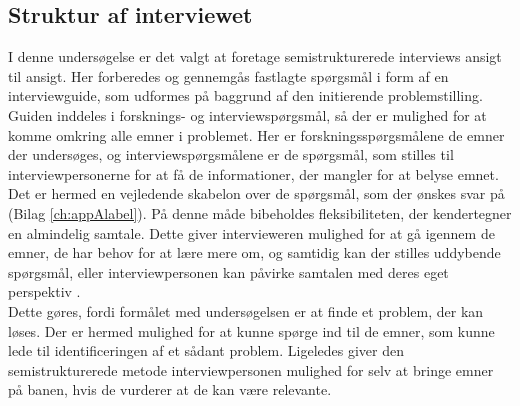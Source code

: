 \subsection {Struktur af interviewet}
I denne undersøgelse er det valgt at foretage semistrukturerede interviews ansigt til ansigt. Her forberedes og gennemgås fastlagte spørgsmål i form af en interviewguide, som udformes på baggrund af den initierende problemstilling. Guiden inddeles i forsknings- og interviewspørgsmål, så der er mulighed for at komme omkring alle emner i problemet. Her er forskningsspørgsmålene de emner der undersøges, og interviewspørgsmålene er de spørgsmål, som stilles til interviewpersonerne for at få de informationer, der mangler for at belyse emnet. Det er hermed en vejledende skabelon over de spørgsmål, som der ønskes svar på (Bilag \ref{ch:appAlabel}). På denne måde bibeholdes fleksibiliteten, der kendertegner en almindelig samtale. Dette giver intervieweren mulighed for at gå igennem de emner, de har behov for at lære mere om, og samtidig kan der stilles uddybende spørgsmål, eller interviewpersonen kan påvirke samtalen med deres eget perspektiv \citep{brinkmann2014}\citep{kvale2015}.\\
Dette gøres, fordi formålet med undersøgelsen er at finde et problem, der kan løses. Der er hermed mulighed for at kunne spørge ind til de emner, som kunne lede til identificeringen af et sådant problem. Ligeledes giver den semistrukturerede metode interviewpersonen mulighed for selv at bringe emner på banen, hvis de vurderer at de kan være relevante.

